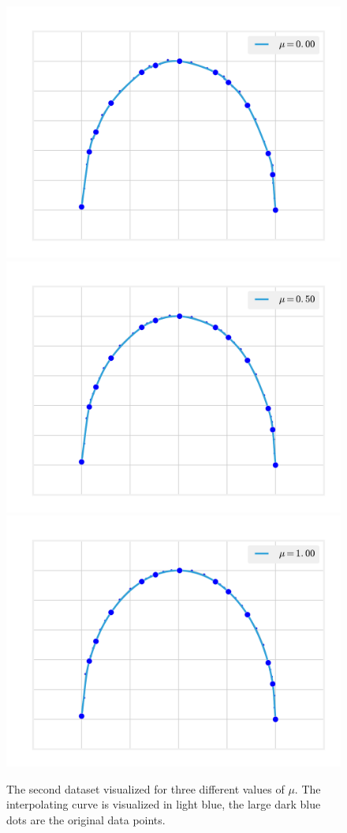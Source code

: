 \documentclass{article}
\begin{document}
\begin{figure}
    \centering
    \includegraphics[scale=0.4]{pictures/two_0.pdf} 
    \includegraphics[scale=0.4]{pictures/two_1.pdf}
    \includegraphics[scale=0.4]{pictures/two_2.pdf}
    \caption{The second dataset visualized for three different values of
    $\mu$. The interpolating curve is visualized in light blue, the large
    dark blue dots are the original data points.}
\end{figure}
\end{document}
